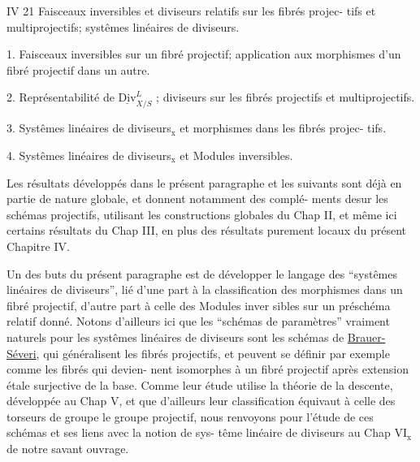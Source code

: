 
IV 21 Faisceaux inversibles et diviseurs relatifs sur les fibrés projec-%
tifs et multiprojectifs; systêmes linéaires de diviseurs.

1. Faisceaux inversibles sur  un fibré projectif; application aux
morphismes d'un fibré projectif dans un autre.

2. Représentabilité de $\underline{\mathrm{Div}}^{L}_{X/S}$ ; diviseurs  sur les fibrés projectifs et
multiprojectifs.

3. Systêmes linéaires de diviseurs$_{\mathrm{x}}$ et morphismes dans les fibrés projec-%
tifs.

4. Systêmes linéaires de diviseurs$_{\mathrm{x}}$ et Modules inversibles.

Les résultats développés dans le présent paragraphe et les suivants
sont déjà en partie de nature globale, et donnent notamment des complé-%
ments desur les schémas projectifs, utilisant  les
constructions globales du Chap II, et même ici certains résultats du
Chap III, en plus des résultats purement locaux du présent Chapitre IV.

Un des buts du présent paragraphe est de développer le langage des
``systêmes linéaires de diviseurs'', lié d'une part à la classification des
morphismes dans un fibré projectif, d'autre part à celle des Modules inver
sibles sur un préschéma relatif donné. Notons d'ailleurs ici que les
``schémas de paramètres'' vraiment naturels pour les systêmes linéaires de
diviseurs sont les schémas de \uline{Brauer-Séveri}, qui généralisent les fibrés
projectifs, et peuvent se définir par exemple comme les fibrés qui devien-%
nent isomorphes à un fibré projectif après extension étale surjective de
la base. Comme leur étude utilise la théorie de la descente, développée
au Chap V, et que d'ailleurs leur classification équivaut à celle des 
 torseurs de groupe le groupe projectif, nous
renvoyons pour l'étude de ces schémas et ses liens avec la notion de sys-%
tême linéaire de diviseurs au Chap VI$_{\mathrm{x}}$ de notre savant ouvrage.

